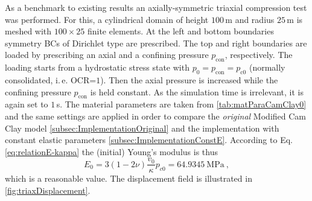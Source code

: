 \documentclass[paper=a4, twoside, pagesize]{scrartcl}
\renewcommand{\c}{\text{c}}
\begin{document}
As a benchmark to existing results an axially-symmetric triaxial compression test was performed. For this, a cylindrical domain of height $100$\,m and radius $25$\,m is meshed with $100\times 25$ finite elements. At the left and bottom boundaries symmetry BCs of Dirichlet type are prescribed. The top and right boundaries are loaded by prescribing an axial and a confining pressure $p_{\text{con}}$, respectively. The loading starts from a hydrostatic stress state with $p_0=p_{\text{con}}=p_{\c0}$ (normally consolidated, i.\,e. OCR=$1$). Then the axial pressure is increased while the confining pressure $p_{\text{con}}$ is held constant. As the simulation time is irrelevant, it is again set to $1\,$s. The material parameters are taken from \autoref{tab:matParaCamClay0} and the same settings are applied in order to compare the \emph{original} Modified Cam Clay model \ref{subsec:ImplementationOriginal} and the implementation with constant elastic parameters \ref{subsec:ImplementationConstE}. According to Eq. \eqref{eq:relationE-kappa} the (initial) Young's modulus is thus
$$
E_0 = 3(1-2\nu) \frac{v_0}{\kappa} p_{c0}= 64.9345~\text{MPa} \ ,
$$
which is a reasonable value. The displacement field is illustrated in \autoref{fig:triaxDisplacement}.
\end{document}
